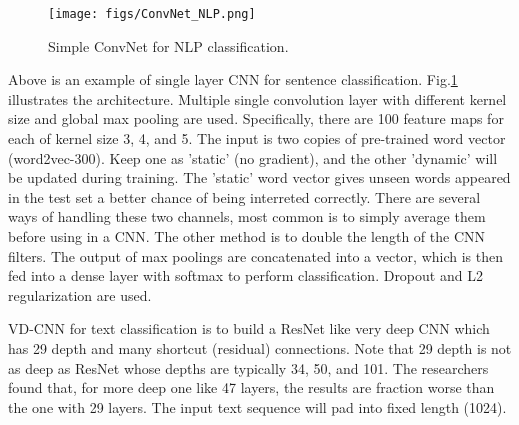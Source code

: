 \begin{figure}[!thp]
	\centerline{\texttt{[image: figs/ConvNet\_NLP.png]}}
	\caption{Simple ConvNet for NLP classification.}
	\label{fig:ConvNetNLP}
\end{figure}

Above is an example  of single layer CNN for sentence classification.
Fig.\ref{fig:ConvNetNLP} illustrates the architecture.
Multiple single convolution layer with different kernel size and global max pooling are used.
Specifically, there are 100 feature maps for each of kernel size 3, 4, and 5. 
The input is two copies of pre-trained word vector (word2vec-300).
Keep one as 'static' (no gradient), and the other 'dynamic' will be updated during training.
The 'static' word vector gives unseen words appeared in the test set a better chance of being interreted correctly.
There are several ways of handling these two channels, most common is to simply average them before using in a CNN.
The other method is to double the length of the CNN filters.
The output of max poolings are concatenated into a vector, which is then fed into a dense layer with softmax to perform classification.
Dropout and L2 regularization are used.

VD-CNN  for text classification is to build a ResNet like very deep CNN which has 29 depth and many shortcut (residual) connections.
Note that 29 depth is not as deep as ResNet whose depths are typically 34, 50, and 101.
The researchers found that, for more deep one like 47 layers, the results are fraction worse than the one with 29 layers.
The input text sequence will pad into fixed length (1024).

